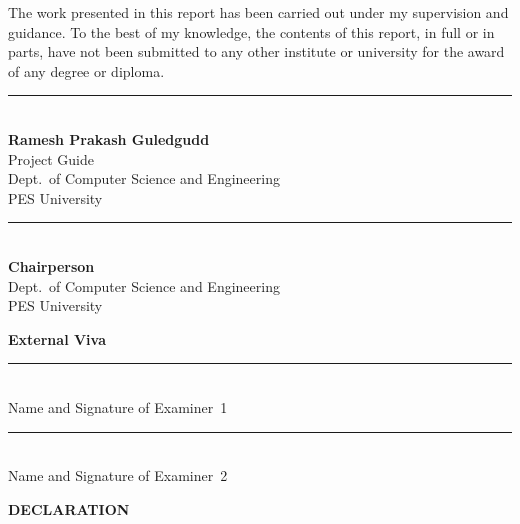 \documentclass[12pt,a4paper]{report}
\begin{document}
\vspace{0.6em}

The work presented in this report has been carried out under my supervision and
guidance. To the best of my knowledge, the contents of this report, in full or in
parts, have not been submitted to any other institute or university for the award
of any degree or diploma.

\vspace{3.2em}

\noindent
\begin{minipage}[t]{0.48\linewidth}
\centering
\rule{5cm}{0.4pt}\\
\textbf{Ramesh Prakash Guledgudd}\\
Project Guide\\
Dept.\ of Computer Science and Engineering\\
PES University
\end{minipage}
\hfill
\begin{minipage}[t]{0.48\linewidth}
\centering
\rule{5cm}{0.4pt}\\
\textbf{Chairperson}\\
Dept.\ of Computer Science and Engineering\\
PES University
\end{minipage}

\vspace{3.0em}

\begin{center}\textbf{External Viva}\end{center}
\vspace{0.3em}
\noindent
\begin{minipage}[t]{0.48\linewidth}
\centering
\rule{5cm}{0.4pt}\\
Name and Signature of Examiner~1
\end{minipage}
\hfill
\begin{minipage}[t]{0.48\linewidth}
\centering
\rule{5cm}{0.4pt}\\
Name and Signature of Examiner~2
\end{minipage}

\clearpage
\thispagestyle{empty}
\begin{center}
{\Large\bfseries DECLARATION\par}
\end{center}
\vspace{1.0em}
\end{document}
